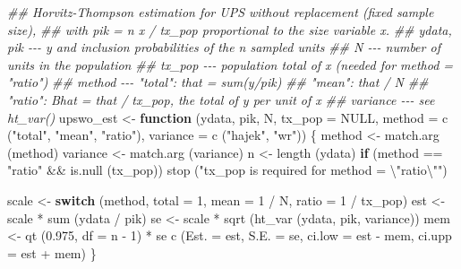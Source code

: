 \documentclass[
  letterpaper,
  DIV=11,
  numbers=noendperiod]{scrreprt}
\newenvironment{Shaded}{\begin{snugshade}}{\end{snugshade}}
\newcommand{\AttributeTok}[1]{\textcolor[rgb]{0.40,0.45,0.13}{#1}}
\newcommand{\ConstantTok}[1]{\textcolor[rgb]{0.56,0.35,0.01}{#1}}
\newcommand{\ControlFlowTok}[1]{\textcolor[rgb]{0.00,0.23,0.31}{\textbf{#1}}}
\newcommand{\DecValTok}[1]{\textcolor[rgb]{0.68,0.00,0.00}{#1}}
\newcommand{\DocumentationTok}[1]{\textcolor[rgb]{0.37,0.37,0.37}{\textit{#1}}}
\newcommand{\FloatTok}[1]{\textcolor[rgb]{0.68,0.00,0.00}{#1}}
\newcommand{\FunctionTok}[1]{\textcolor[rgb]{0.28,0.35,0.67}{#1}}
\newcommand{\NormalTok}[1]{\textcolor[rgb]{0.00,0.23,0.31}{#1}}
\newcommand{\OtherTok}[1]{\textcolor[rgb]{0.00,0.23,0.31}{#1}}
\newcommand{\SpecialCharTok}[1]{\textcolor[rgb]{0.37,0.37,0.37}{#1}}
\newcommand{\StringTok}[1]{\textcolor[rgb]{0.13,0.47,0.30}{#1}}
\renewcommand{\[}{\begin{equation}}
\renewcommand{\]}{\end{equation}}
\begin{document}
\begin{Shaded}
\begin{Highlighting}[]
\DocumentationTok{\#\# Horvitz{-}Thompson estimation for UPS without replacement (fixed sample size),}
\DocumentationTok{\#\# with pik = n x / tx\_pop proportional to the size variable x.}
\DocumentationTok{\#\# ydata, pik {-}{-}{-} y and inclusion probabilities of the n sampled units}
\DocumentationTok{\#\# N {-}{-}{-} number of units in the population}
\DocumentationTok{\#\# tx\_pop {-}{-}{-} population total of x (needed for method = "ratio")}
\DocumentationTok{\#\# method {-}{-}{-} "total": that = sum(y/pik)}
\DocumentationTok{\#\#            "mean": that / N}
\DocumentationTok{\#\#            "ratio": Bhat = that / tx\_pop, the total of y per unit of x}
\DocumentationTok{\#\# variance {-}{-}{-} see ht\_var()}
\NormalTok{upswo\_est }\OtherTok{\textless{}{-}} \ControlFlowTok{function}\NormalTok{ (ydata, pik, N, }\AttributeTok{tx\_pop =} \ConstantTok{NULL}\NormalTok{,}
                       \AttributeTok{method =} \FunctionTok{c}\NormalTok{ (}\StringTok{"total"}\NormalTok{, }\StringTok{"mean"}\NormalTok{, }\StringTok{"ratio"}\NormalTok{),}
                       \AttributeTok{variance =} \FunctionTok{c}\NormalTok{ (}\StringTok{"hajek"}\NormalTok{, }\StringTok{"wr"}\NormalTok{))}
\NormalTok{\{}
\NormalTok{  method }\OtherTok{\textless{}{-}} \FunctionTok{match.arg}\NormalTok{ (method)}
\NormalTok{  variance }\OtherTok{\textless{}{-}} \FunctionTok{match.arg}\NormalTok{ (variance)}
\NormalTok{  n }\OtherTok{\textless{}{-}} \FunctionTok{length}\NormalTok{ (ydata)}
  \ControlFlowTok{if}\NormalTok{ (method }\SpecialCharTok{==} \StringTok{"ratio"} \SpecialCharTok{\&\&} \FunctionTok{is.null}\NormalTok{ (tx\_pop))}
    \FunctionTok{stop}\NormalTok{ (}\StringTok{"tx\_pop is required for method = }\SpecialCharTok{\textbackslash{}"}\StringTok{ratio}\SpecialCharTok{\textbackslash{}"}\StringTok{"}\NormalTok{)}

\NormalTok{  scale }\OtherTok{\textless{}{-}} \ControlFlowTok{switch}\NormalTok{ (method, }\AttributeTok{total =} \DecValTok{1}\NormalTok{, }\AttributeTok{mean =} \DecValTok{1} \SpecialCharTok{/}\NormalTok{ N, }\AttributeTok{ratio =} \DecValTok{1} \SpecialCharTok{/}\NormalTok{ tx\_pop)}
\NormalTok{  est }\OtherTok{\textless{}{-}}\NormalTok{ scale }\SpecialCharTok{*} \FunctionTok{sum}\NormalTok{ (ydata }\SpecialCharTok{/}\NormalTok{ pik)}
\NormalTok{  se }\OtherTok{\textless{}{-}}\NormalTok{ scale }\SpecialCharTok{*} \FunctionTok{sqrt}\NormalTok{ (}\FunctionTok{ht\_var}\NormalTok{ (ydata, pik, variance))}
\NormalTok{  mem }\OtherTok{\textless{}{-}} \FunctionTok{qt}\NormalTok{ (}\FloatTok{0.975}\NormalTok{, }\AttributeTok{df =}\NormalTok{ n }\SpecialCharTok{{-}} \DecValTok{1}\NormalTok{) }\SpecialCharTok{*}\NormalTok{ se}
  \FunctionTok{c}\NormalTok{ (}\AttributeTok{Est. =}\NormalTok{ est, }\AttributeTok{S.E. =}\NormalTok{ se, }\AttributeTok{ci.low =}\NormalTok{ est }\SpecialCharTok{{-}}\NormalTok{ mem, }\AttributeTok{ci.upp =}\NormalTok{ est }\SpecialCharTok{+}\NormalTok{ mem)}
\NormalTok{\}}


\end{Highlighting}
\end{Shaded}
\end{document}
